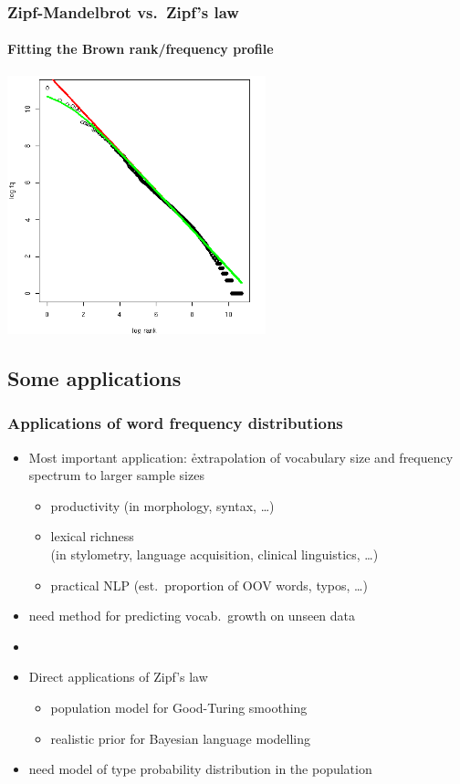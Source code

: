 \documentclass[handout,notes=show,t]{beamer} %
\begin{document}
\begin{frame}
  \frametitle{Zipf-Mandelbrot vs.\ Zipf's law} 
  \framesubtitle{Fitting the Brown rank/frequency profile}

  \begin{center}
    \includegraphics[height=7.5cm]{img/brown-zipf-man-rf}
  \end{center}
\end{frame}

\subsection{Some applications}

\begin{frame}
  \frametitle{Applications of word frequency distributions}

  \begin{itemize}
  \item Most important application: \h{extrapolation} of vocabulary size and
    frequency spectrum to larger sample sizes
    \begin{itemize}
    \item productivity (in morphology, syntax, \ldots)
    \item lexical richness\\ (in stylometry, language acquisition, clinical linguistics, \ldots)
    \item practical NLP (est.\ proportion of OOV words, typos, \ldots)
    \end{itemize}
  \item[\hand] need method for predicting vocab.\ growth on unseen data
  \item[]\pause
  \item Direct applications of Zipf's law
    \begin{itemize}
    \item population model for Good-Turing smoothing
    \item realistic prior for Bayesian language modelling
    \end{itemize}
  \item[\hand] need model of type probability distribution in the population
  \end{itemize}
\end{frame}
\end{document}

